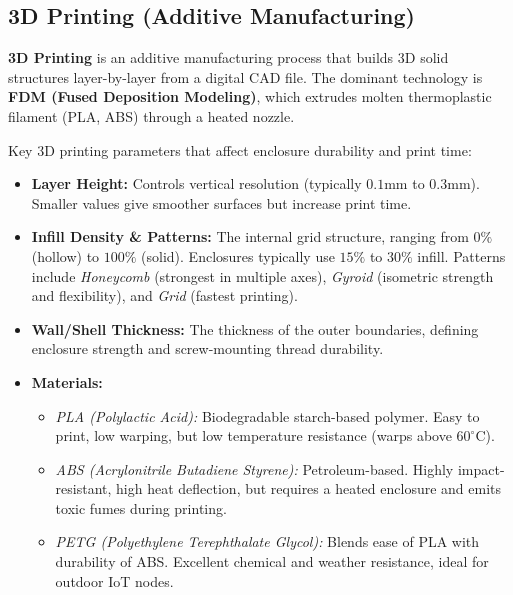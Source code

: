 \documentclass[12pt,a4paper]{article}
\begin{document}
\subsection{3D Printing (Additive Manufacturing)}
\begin{tcolorbox}[defbox, title={3D Printing (Additive)}]
  \textbf{3D Printing} is an additive manufacturing process that builds 3D solid structures layer-by-layer from a digital CAD file. The dominant technology is \textbf{FDM (Fused Deposition Modeling)}, which extrudes molten thermoplastic filament (PLA, ABS) through a heated nozzle.
\end{tcolorbox}
Key 3D printing parameters that affect enclosure durability and print time:
\begin{itemize}[leftmargin=*, itemsep=3pt]
  \item \textbf{Layer Height:} Controls vertical resolution (typically $0.1\text{mm}$ to $0.3\text{mm}$). Smaller values give smoother surfaces but increase print time.
  \item \textbf{Infill Density \& Patterns:} The internal grid structure, ranging from $0\%$ (hollow) to $100\%$ (solid). Enclosures typically use $15\%$ to $30\%$ infill. Patterns include \textit{Honeycomb} (strongest in multiple axes), \textit{Gyroid} (isometric strength and flexibility), and \textit{Grid} (fastest printing).
  \item \textbf{Wall/Shell Thickness:} The thickness of the outer boundaries, defining enclosure strength and screw-mounting thread durability.
  \item \textbf{Materials:}
        \begin{itemize}[leftmargin=*, label=$\circ$, itemsep=1.0pt]
          \item \textit{PLA (Polylactic Acid):} Biodegradable starch-based polymer. Easy to print, low warping, but low temperature resistance (warps above $60^\circ\text{C}$).
          \item \textit{ABS (Acrylonitrile Butadiene Styrene):} Petroleum-based. Highly impact-resistant, high heat deflection, but requires a heated enclosure and emits toxic fumes during printing.
          \item \textit{PETG (Polyethylene Terephthalate Glycol):} Blends ease of PLA with durability of ABS. Excellent chemical and weather resistance, ideal for outdoor IoT nodes.
        \end{itemize}
\end{itemize}
\end{document}

